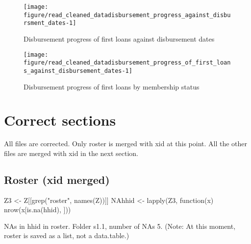 \begin{Schunk}
\begin{figure}

{\centering \texttt{[image: figure/read\_cleaned\_datadisbursement\_progress\_against\_disbursment\_dates-1]} 

}

\caption[Disbursement progress of first loans against disbursement dates]{Disbursement progress of first loans against disbursement dates}\label{Figure disbursement progress against disbursment dates}
\end{figure}
\end{Schunk}
\begin{Schunk}
\begin{figure}

{\centering \texttt{[image: figure/read\_cleaned\_datadisbursement\_progress\_of\_first\_loans\_against\_disbursement\_dates-1]} 

}

\caption[Disbursement progress of first loans by membership status]{Disbursement progress of first loans by membership status}\label{Figure disbursement progress of first loans against disbursement dates}
\end{figure}
\end{Schunk}





\section{Correct sections}


All files are corrected. Only \textsf{roster} is merged with \textsf{xid} at this point. All the other files are merged with \textsf{xid} in the next section.



\subsection{Roster (xid merged)}


\begin{Schunk}
\begin{Sinput}
Z3 <- Z[[grep("roster", names(Z))]]
NAhhid <- lapply(Z3, function(x) nrow(x[is.na(hhid), ]))
\end{Sinput}
\end{Schunk}
NAs in \textsf{hhid} in roster. Folder {\footnotesize s1.1}, number of NAs 5. (Note: At this moment, \textsf{roster} is saved as a list, not a data.table.)  \gobblepars

